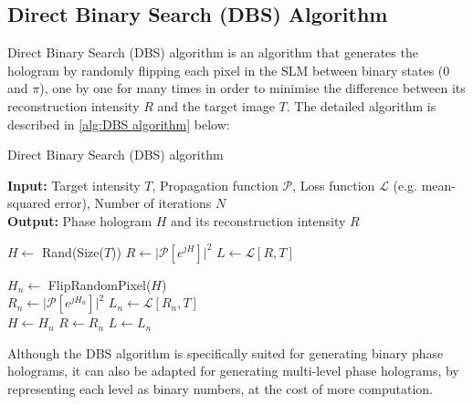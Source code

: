 \newpage
\subsection{Direct Binary Search (DBS) Algorithm}\label{sec:Direct Binary Search (DBS) Algorithm}
Direct Binary Search (DBS) algorithm \cite{Seldowitz1987} is an algorithm that generates the hologram by randomly flipping each pixel in the SLM between binary states (0 and $\pi$), one by one for many times in order to minimise the difference between its reconstruction intensity $R$ and the target image $T$. The detailed algorithm is described in \cref{alg:DBS algorithm} below:
\begin{algorithm}[H]
  \caption{Direct Binary Search (DBS) algorithm}\label{alg:DBS algorithm}
  \textbf{Input:} Target intensity $T$, Propagation function $\mathcal{P}$, Loss function $\mathcal{L}$ (e.g. mean-squared error), Number of iterations $N$ \\
  \textbf{Output:} Phase hologram $H$ and its reconstruction intensity $R$
  \begin{algorithmic}
    \State $H \gets$ Rand(Size($T$))
    \State $R \gets \vert \mathcal{P}[e^{jH}] \vert ^2$
    \State $L \gets \mathcal{L} [R, T]$

    \State $H_n \gets$ FlipRandomPixel($H$)\\
    \State $R_n \gets \vert \mathcal{P}[e^{jH_n}] \vert ^2$
    \State $L_n \gets \mathcal{L} [R_n, T]$\\
    \State $H \gets H_n$
    \State $R \gets R_n$
    \State $L \gets L_n$
    \EndIf
    \EndFor
  \end{algorithmic}
\end{algorithm}

Although the DBS algorithm is specifically suited for generating binary phase holograms, it can also be adapted for generating multi-level phase holograms, by representing each level as binary numbers, at the cost of more computation.

